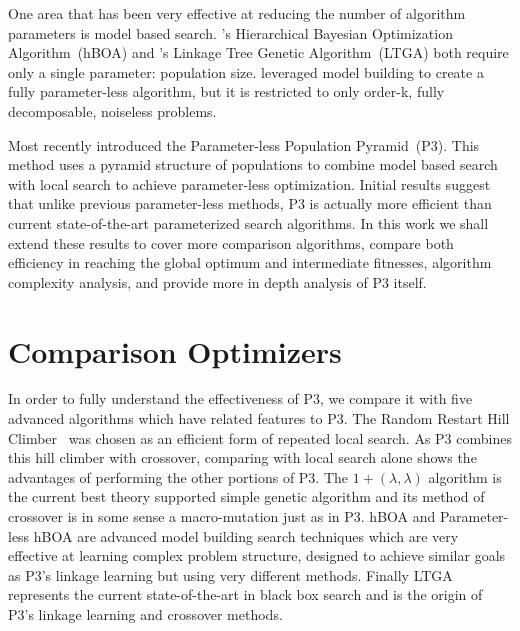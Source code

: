 \documentclass[twoside]{article}
\begin{document}
One area that has been very effective at reducing the number of algorithm parameters is
model based search. \cite{pelikan:2006:hboa}'s Hierarchical Bayesian Optimization
Algorithm~(hBOA) and \cite{thierens:2010:ltga}'s Linkage Tree Genetic Algorithm~(LTGA)
both require only a single parameter: population size. \cite{posik:2011:parameterless}
leveraged model building to create a fully parameter-less algorithm, but it is restricted to
only order-k, fully decomposable, noiseless problems.

Most recently \cite{goldman:2014:p3} introduced the Parameter-less Population Pyramid~(P3).
This method uses a pyramid structure of populations to combine model based search with local search
to achieve parameter-less optimization. Initial results suggest that unlike
previous parameter-less methods, P3 is actually more efficient than current state-of-the-art
parameterized search algorithms. In this work we shall extend these results to cover more
comparison algorithms, compare both efficiency in reaching the global optimum and intermediate
fitnesses, algorithm complexity analysis, and provide more in depth analysis of P3 itself.
\begin{comment}
Section~\ref{sec-optimizers}
explains how each of these algorithms, including P3, perform search. Section~\ref{sec-problems}
provides a description of each test problem. As hBOA and LTGA require a population size parameter
Section~\ref{sec-tuning} provides our methodology to ensure each is optimally tuned to each problem.
\end{comment}

\section{Comparison Optimizers}
\label{sec-optimizers}

In order to fully understand the effectiveness of P3, we compare it with five advanced algorithms which
have related features to P3. The Random Restart Hill Climber~\citep{goldman:2014:p3} was chosen as an efficient form of repeated
local search. As P3 combines this hill climber with crossover,
comparing with local search alone shows the advantages of performing the other portions of P3.
The $1+(\lambda, \lambda)$ algorithm is the current best theory supported simple genetic algorithm
and its method of crossover is in some sense a macro-mutation just as in P3. hBOA and Parameter-less
hBOA are advanced model building search techniques which are very effective at learning complex
problem structure, designed to achieve similar goals as P3's linkage learning but using very different
methods. Finally LTGA represents the current state-of-the-art in black box search and is the origin
of P3's linkage learning and crossover methods.
\end{document}
